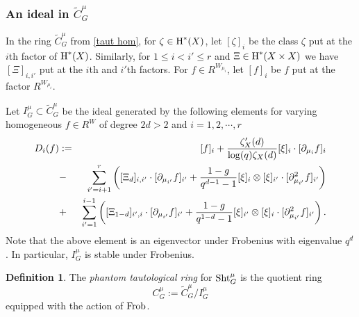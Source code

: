 \documentclass[reqno]{amsart}
\numberwithin{equation}{subsection}
\theoremstyle{definition}
\newtheorem{defn}[subsubsection]{Definition}
\newcommand\Frob{\textup{Frob}}
\newcommand\Sht{\textup{Sht}}
\newcommand{\wt}[1]{\widetilde{#1}}
\newcommand\ot{\otimes}
\newcommand{\cohog}[2]{\textup{H}^{#1}({#2})}     %
\newcommand{\z}{\zeta}
\newcommand\pl{\partial}
\begin{document}

\subsubsection{An ideal in $\wt C^\mu_G$}
In the ring $\wt C^\mu_G$ from \eqref{taut hom}, for $\z\in \cohog{*}{X}$, let $[\z]_i$ be the class $\z$ put at the $i$th factor of $\cohog{*}{X}$. Similarly, for $1\le i<i'\le r$ and $\Xi\in \cohog{*}{X\times X}$ we have $[\Xi]_{i,i'}$ put at the $i$th and $i'$th factors. For $f\in R^{W_{\mu_i}}$, let $[f]_{i}$ be $f$ put at the factor $ R^{W_{\mu_i}}$.

Let $I^\mu_G\subset \wt C^\mu_G$ be the ideal generated by the following elements for varying homogeneous $f\in R^W$ of degree $2d>2$ and $i=1,2,\cdots, r$
\begin{eqnarray}\label{rel in C}
    D_i(f)&:=&[f]_{i}+\frac{\z'_X(d)}{\log(q)\z_X(d)}[\xi]_{i}\cdot [\pl_{\mu_{i}}f]_{i}\\
\notag    &-&\sum_{i'=i+1}^{r}\left([\Xi_d]_{i, i'}\cdot [\pl_{\mu_{i'}}f]_{i'}+\frac{1-g
    }{q^{d-1}-1}[\xi]_{i}\ot [\xi]_{i'}\cdot [\pl_{\mu_{i'}}^2f]_{i'}\right)\\
\notag    &+&\sum_{i'=1}^{i-1}\left([\Xi_{1-d}]_{i', i}\cdot [\pl_{\mu_{i'}}f]_{i'}+\frac{1-g
    }{q^{1-d}-1}[\xi]_{i'}\ot [\xi]_{i}\cdot [\pl_{\mu_{i'}}^2f]_{i'}\right).
\end{eqnarray}
Note that the above element is an eigenvector under Frobenius with eigenvalue $q^d$. In particular, $I^\mu_G$ is stable under Frobenius.

\begin{defn}\label{def:taut}
    The {\em phantom tautological ring} for $\Sht^\mu_G$ is the quotient ring
    $$C^\mu_G:=\wt C^\mu_G/I^\mu_G$$
    equipped with the action of $\Frob$.
\end{defn}
\end{document}
